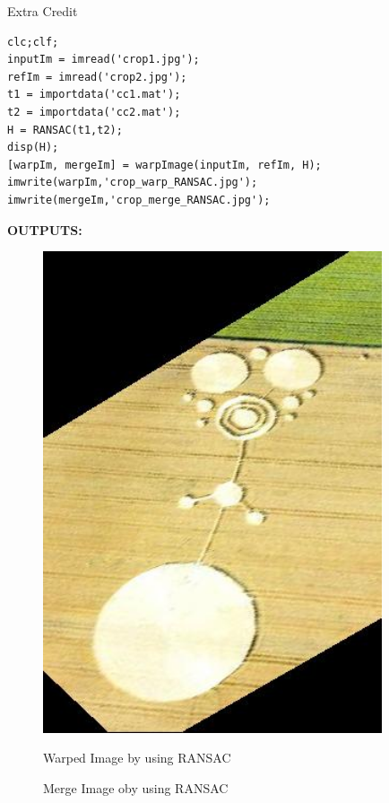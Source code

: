 \documentclass[a4paper,12pt]{article}
\begin{document}
\clearpage
\begin{section}{Extra Credit}
\begin{lstlisting}[frame=single]  % Start your code-block
%% Optional (a) RANSAC
clc;clf;
inputIm = imread('crop1.jpg');
refIm = imread('crop2.jpg');
t1 = importdata('cc1.mat');
t2 = importdata('cc2.mat');
H = RANSAC(t1,t2);
disp(H);
[warpIm, mergeIm] = warpImage(inputIm, refIm, H);
imwrite(warpIm,'crop_warp_RANSAC.jpg');
imwrite(mergeIm,'crop_merge_RANSAC.jpg');

\end{lstlisting}

\textbf{OUTPUTS:}
\\

 \begin{figure}[!htb]
       \center
       {\includegraphics[width=10cm]
       {crop_warp_RANSAC.png}}
        \caption{Warped Image by using RANSAC}
      \end{figure}



\begin{figure}[!htb]
        \caption{Merge Image oby using RANSAC}
      \end{figure}

\end{section}
\end{document}
